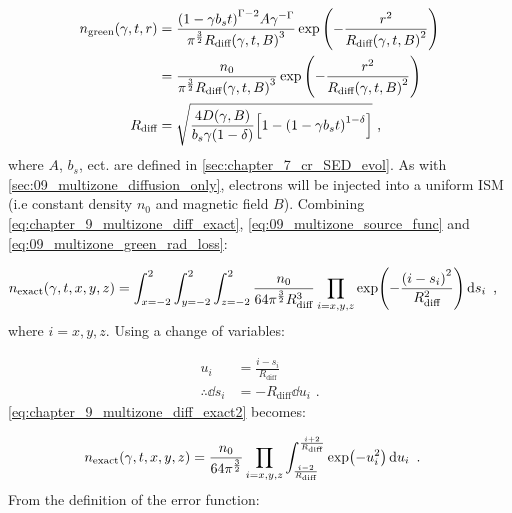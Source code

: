 \begin{equation}
    \begin{aligned}
        n_\text{green}\qty(\gamma,t,r)&=\frac{\qty(1-\gamma b_st)^{\Gamma-2}A\gamma^{-\Gamma}}{\pi^{\frac{3}{2}}R_\text{diff}\qty(\gamma,t,B)^3}\exp\qty(-\frac{r^2}{R_\text{diff}\qty(\gamma,t,B)^2}) \\
        &=\frac{n_0}{\pi^{\frac{3}{2}}R_\text{diff}\qty(\gamma,t,B)^3}\exp\qty(-\frac{r^2}{R_\text{diff}\qty(\gamma,t,B)^2}) \\
        R_\text{diff}&=\sqrt{\frac{4D\qty(\gamma,B)}{b_s\gamma\qty(1-\delta)}\qty[1-\qty(1-\gamma b_s t)^{1-\delta}]}\text{ ,} 
    \end{aligned} \label{eq:09_multizone_green_rad_loss}
\end{equation}
\noindent where $A$, $b_s$, ect. are defined in \autoref{sec:chapter_7_cr_SED_evol}. As with \autoref{sec:09_multizone_diffusion_only}, electrons will be injected into a uniform ISM (i.e constant density $n_0$ and magnetic field $B$). Combining \autoref{eq:chapter_9_multizone_diff_exact}, \autoref{eq:09_multizone_source_func} and \autoref{eq:09_multizone_green_rad_loss}:

\begin{equation}
	\begin{aligned}
		n_\text{exact}\qty(\gamma,t,x,y,z)&=\int_{x=-2}^{2}\int_{y=-2}^{2}\int_{z=-2}^{2}\frac{n_0}{64\pi^{\frac{3}{2}}R_\text{diff}^3}\prod_{i=x,y,z} \exp(-\frac{\qty(i-s_i)^2}{R_\text{diff}^2})\dd{s_i}\text{ ,} 
	\end{aligned} \label{eq:chapter_9_multizone_diff_exact2}
\end{equation}
\noindent where $i=x,y,z$. Using a change of variables:

\begin{equation}
	\begin{aligned}
		u_i&=\frac{i-s_i}{R_\text{diff}} \\
		\therefore \dd{s_i}&=-R_\text{diff}\dd{u_i}\text{ .} 
	\end{aligned}
\end{equation}
\noindent \autoref{eq:chapter_9_multizone_diff_exact2} becomes:

\begin{equation}
	\begin{aligned}
		n_\text{exact}\qty(\gamma,t,x,y,z)&=\frac{n_0}{64\pi^{\frac{3}{2}}}\prod_{i=x,y,z}\int_{\frac{i-2}{R_\text{diff}}}^{\frac{i+2}{R_\text{diff}}}\exp(-u_i^2)\dd{u_i}\text{ .} 
	\end{aligned} \label{eq:09_diff_losses_temp}
\end{equation}
\noindent From the definition of the error function:

